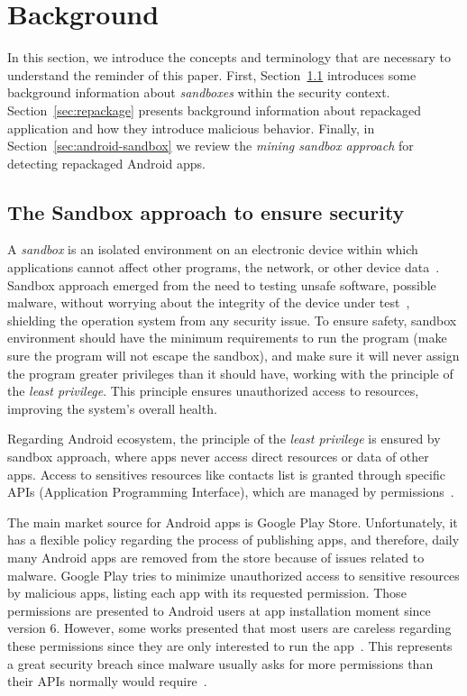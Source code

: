 \section{Background}\label{sec:background}

In this section, we introduce the concepts and terminology that are necessary to understand the reminder of this paper. First, Section~\ref{sec:sand} introduces some background information about \emph{sandboxes} within the security context. Section~\ref{sec:repackage} presents background information about repackaged application and how they introduce malicious behavior.
Finally, in Section~\ref{sec:android-sandbox} we review the \emph{mining sandbox approach} for detecting repackaged Android apps.

\subsection{The Sandbox approach to ensure security}\label{sec:sand}

A \emph{sandbox} is an isolated environment on an electronic device within which applications cannot affect other programs, the network, or other device data~\cite{DBLP:journals/peerj-cs/MaassSCS16}. Sandbox approach emerged from the need to testing unsafe software, possible malware, without worrying about the integrity of the device under test~\cite{DBLP:conf/esorics/BordoniCS17}, shielding the operation system from any security issue. To ensure safety, sandbox environment should have the minimum requirements to run the program (make sure the program will not escape the sandbox), and make sure it will never assign the program greater privileges than it should have, working with the principle of the \emph{least privilege}. This principle ensures unauthorized access to resources, improving the system's overall health.

Regarding Android ecosystem, the principle of the \emph{least privilege} is ensured by sandbox approach, where apps never access direct resources or data of other apps. Access to sensitives resources like contacts list is granted through specific APIs (Application Programming Interface), which are managed by permissions~\cite{DBLP:journals/corr/abs-2109-06613}. 

The main market source for Android apps is Google Play Store. Unfortunately, it has a flexible policy regarding the process of publishing apps, and therefore, daily many Android apps are removed from the store because of issues related to malware\cite{DBLP:conf/msr/WangLL0X18}. Google Play tries to minimize unauthorized access to sensitive resources by malicious apps, listing each app with its requested permission. Those permissions are presented to Android users at app installation moment since version 6. However, some works presented that most users are careless regarding these permissions since they are only interested to run the app~\cite{DBLP:conf/soups/FeltHEHCW12}. This represents a great security breach since malware usually asks for more permissions than their APIs normally would require~\cite{DBLP:conf/ccs/FeltCHSW11}.

